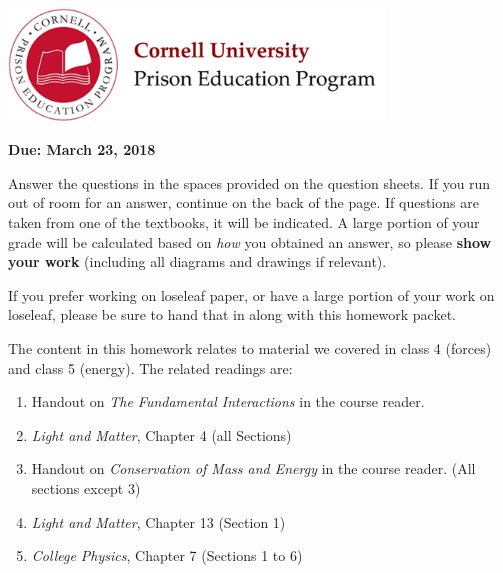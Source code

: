\documentclass[addpoints,12pt]{exam}
\begin{document}

\begin{flushright}
\vspace{0.2in}

\end{flushright}

\begin{center}
\includegraphics[width=10cm]{../images/logo.png}
\end{center}

\begin{center}
\end{center}
\noindent\begin{large}\textbf{Due: March 23, 2018}\end{large}
\vspace{0.2in}

Answer the questions in the spaces provided on the question sheets. If you run out of room for an answer, continue on the back of the page. If questions are taken from one of the textbooks, it will be indicated. A large portion of your grade will be calculated based on \textit{how} you obtained an answer, so please \textbf{show your work} (including all diagrams and drawings if relevant).

If you prefer working on loseleaf paper, or have a large portion of your work on loseleaf, please be sure to hand that in along with this homework packet.

The content in this homework relates to material we covered in class 4 (forces) and class 5 (energy). The related readings are:
\begin{enumerate}
	\item Handout on \textit{The Fundamental Interactions} in the course reader.
	\item \textit{Light and Matter}, Chapter 4 (all Sections)
	\item Handout on \textit{Conservation of Mass and Energy} in the course reader. (All sections except 3)
	\item \textit{Light and Matter}, Chapter 13 (Section 1)
	\item \textit{College Physics}, Chapter 7 (Sections 1 to 6)
\end{enumerate}
\end{document}
